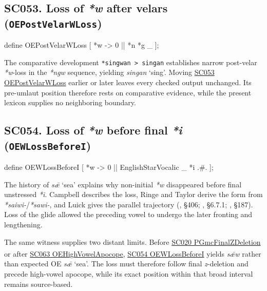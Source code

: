 \documentclass[
  british,
  a4paper,
  openany]{book}
\providecommand{\Pred}[1]{\textsuperscript{\dag}\emph{#1}}
\providecommand{\texorpdfstring}[2]{#1}
\providecommand{\Pred}[1]{\textsuperscript{\dag}\emph{#1}}
\begin{document}
\subsection{\texorpdfstring{SC053. Loss of \emph{*w} after velars
(\texttt{OEPostVelarWLoss})}{SC053. Loss of  after velars (OEPostVelarWLoss)}}\label{rule-OEPostVelarWLoss}

\begin{ReaderFacingFoma}
define OEPostVelarWLoss [
    {*w} -> 0 || {*n} {*g} _
];
\end{ReaderFacingFoma}

The comparative development \texttt{*singwan\ \textgreater{}\ singan}
establishes narrow post-velar \emph{*w}-loss in the \emph{*ngw}
sequence, yielding \emph{singan} `sing'. Moving
\hyperref[rule-OEPostVelarWLoss]{SC053 OEPostVelarWLoss} earlier or
later leaves every checked output unchanged. Its pre-umlaut position
therefore rests on comparative evidence, while the present lexicon
supplies no neighboring boundary.

\subsection{\texorpdfstring{SC054. Loss of \emph{*w} before final
\emph{*i}
(\texttt{OEWLossBeforeI})}{SC054. Loss of  before final  (OEWLossBeforeI)}}\label{rule-OEWLossBeforeI}

\begin{ReaderFacingFoma}
define OEWLossBeforeI [
    {*w} -> 0 || EnglishStarVocalic _ {*i} .#.
];
\end{ReaderFacingFoma}

The history of \emph{sǣ} `sea' explains why non-initial \emph{*w}
disappeared before final unstressed \emph{*i}. Campbell describes the
loss, Ringe and Taylor derive the form from
\emph{*saiwi-}/\emph{*sawi-}, and Luick gives the parallel trajectory
(, §406;
, §6.7.1;
, §187). Loss of the
glide allowed the preceding vowel to undergo the later fronting and
lengthening.

The same witness supplies two distant limits. Before
\hyperref[rule-PGmcFinalZDeletion]{SC020 PGmcFinalZDeletion} or after
\hyperref[rule-OEHighVowelApocope]{SC063 OEHighVowelApocope},
\hyperref[rule-OEWLossBeforeI]{SC054 OEWLossBeforeI} yields \Pred{sǣw}
rather than expected OE \emph{sǣ} `sea'. The loss must therefore follow
final \emph{z}-deletion and precede high-vowel apocope, while its exact
position within that broad interval remains source-based.
\end{document}
